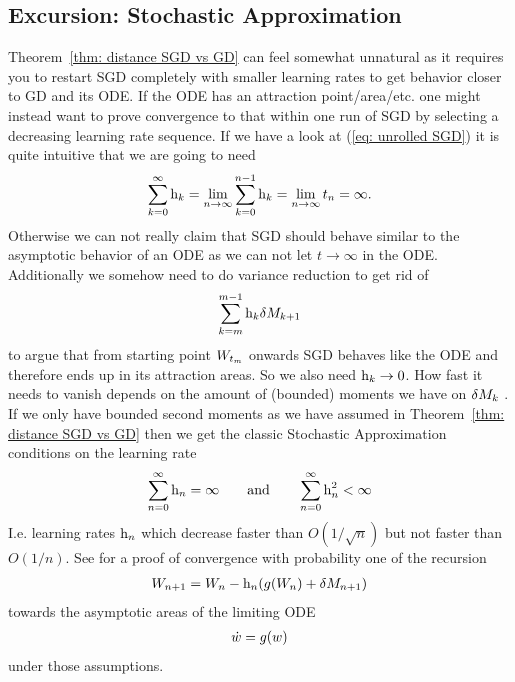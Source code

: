\subsection{Excursion: Stochastic Approximation}

Theorem~\ref{thm: distance SGD vs GD} can feel somewhat unnatural as it requires
you to restart SGD completely with smaller learning rates to get behavior closer
to GD and its ODE. If the ODE has an attraction point/area/etc. one might
instead want to prove convergence to that within one run of SGD by selecting a
decreasing learning rate sequence. If we have a look at (\ref{eq: unrolled SGD})
it is quite intuitive that we are going to need
\begin{align*}
	\sum_{k=0}^\infty \text{h}_k = \lim_{n\to\infty}\sum_{k=0}^{n-1} \text{h}_k
	= \lim_{n\to\infty}t_n = \infty.
\end{align*}
Otherwise we can not really claim that SGD should behave similar to the asymptotic
behavior of an ODE as we can not let \(t\to\infty\) in the ODE. Additionally
we somehow need to do variance reduction to get rid of
\begin{align*}
	\sum_{k=m}^{m-1} \text{h}_k\delta M_{k+1}
\end{align*}
to argue that from starting point \(W_{t_m}\) onwards SGD behaves like the ODE
and therefore ends up in its attraction areas. So we also need
\(\text{h}_k \to 0\). How fast it needs to vanish depends on the amount of (bounded)
moments we have on \(\delta M_k\) \parencite[p. 110]{kushnerStochasticApproximationAlgorithms1997}.
If we only have bounded second moments as we have assumed in Theorem~\ref{thm:
distance SGD vs GD} then we get the classic Stochastic Approximation conditions
on the learning rate
\begin{align*}
	\sum_{n=0}^\infty \text{h}_n = \infty \qquad \text{and} \qquad \sum_{n=0}^\infty \text{h}_n^2 <\infty
\end{align*}
I.e. learning rates \(\text{h}_n\) which decrease faster than \(O(1/\sqrt{n})\) but
not faster than \(O(1/n)\). See \textcite[ch.
5]{kushnerStochasticApproximationAlgorithms1997} for a proof of
convergence with probability one of the recursion
\begin{align*}
	W_{n+1} = W_n - \text{h}_n(g(W_n) + \delta M_{n+1})
\end{align*}
towards the asymptotic areas of the limiting
ODE
\begin{align*}
	\dot{w} = g(w)
\end{align*}
under those assumptions.

